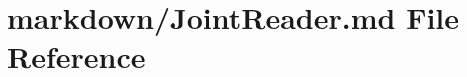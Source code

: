\hypertarget{JointReader_8md}{\section{markdown/\-Joint\-Reader.md File Reference}
\label{JointReader_8md}
}
